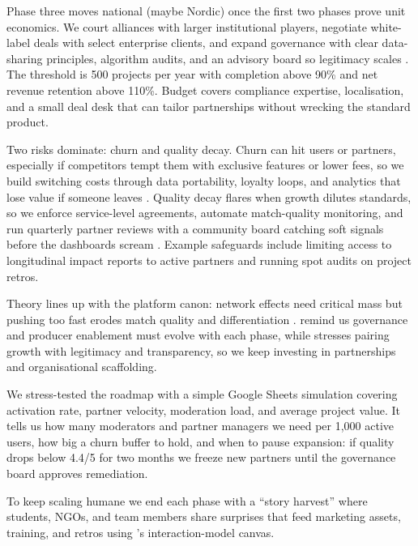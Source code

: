 Phase three moves national (maybe Nordic) once the first two phases prove unit economics. We court alliances with larger institutional players, negotiate white-label deals with select enterprise clients, and expand governance with clear data-sharing principles, algorithm audits, and an advisory board so legitimacy scales \citep{Srnicek2017,Zuboff2019}. The threshold is 500 projects per year with completion above 90\% and net revenue retention above 110\%. Budget covers compliance expertise, localisation, and a small deal desk that can tailor partnerships without wrecking the standard product.

Two risks dominate: churn and quality decay. Churn can hit users or partners, especially if competitors tempt them with exclusive features or lower fees, so we build switching costs through data portability, loyalty loops, and analytics that lose value if someone leaves \citep{FarrellSaloner1986,ShapiroVarian1999}. Quality decay flares when growth dilutes standards, so we enforce service-level agreements, automate match-quality monitoring, and run quarterly partner reviews with a community board catching soft signals before the dashboards scream \citep{Reillier2017}. Example safeguards include limiting access to longitudinal impact reports to active partners and running spot audits on project retros.

Theory lines up with the platform canon: network effects need critical mass but pushing too fast erodes match quality and differentiation \citep{Porter2008}. \citet{Choudary2016} remind us governance and producer enablement must evolve with each phase, while \citet{Srnicek2017} stresses pairing growth with legitimacy and transparency, so we keep investing in partnerships and organisational scaffolding.

We stress-tested the roadmap with a simple Google Sheets simulation covering activation rate, partner velocity, moderation load, and average project value. It tells us how many moderators and partner managers we need per 1,000 active users, how big a churn buffer to hold, and when to pause expansion: if quality drops below 4.4/5 for two months we freeze new partners until the governance board approves remediation.

To keep scaling humane we end each phase with a ``story harvest'' where students, NGOs, and team members share surprises that feed marketing assets, training, and retros using \citet{Choudary2016}'s interaction-model canvas.
